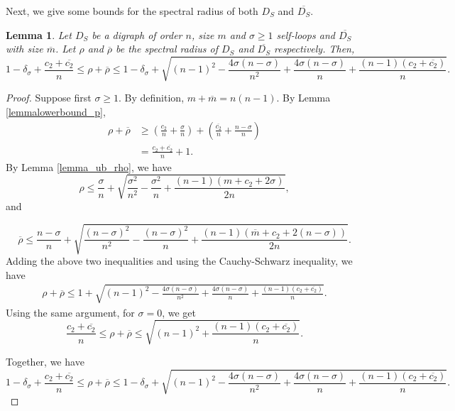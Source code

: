 \documentclass[12pt,a4paper,reqno]{amsart}
\numberwithin{equation}{section}
\theoremstyle{plain}
\newtheorem{lemma}[theorem]{Lemma}
\theoremstyle{definition}
\newcommand{\<}{\langle}
\renewcommand{\>}{\rangle}
\begin{document}
    Next, we give some bounds for the spectral radius of both $D_S$ and $\overline{D_S}$.

    \begin{lemma}
    \label{ul_bounds_p+p-}
        Let $D_S$ be a digraph of order $n$, size $m$ and $\sigma\geq1$ self-loops
        and $\overline{D_S}$ with size $\overline{m}$. Let $\rho$ and $\overline{\rho}$ be the spectral radius of $D_S$ and $\overline{D_S}$ respectively. Then,
        \begin{equation}
            \label{eq:ul_bounds_p+p-}
            1-\delta_\sigma+\frac{c_2+\overline{c_2}}{n} \leq \rho+ \overline{\rho} \leq 1-\delta_\sigma + \sqrt{ (n-1)^2-\frac{4\sigma(n-\sigma)}{n^2} + \frac{4\sigma(n-\sigma)}{n}+\frac{(n-1)(c_2+\overline{c_2})}{n} }.
        \end{equation}
    \end{lemma}

    \begin{proof}
        Suppose first $\sigma\geq1$. By definition, $m+\overline{m}=n(n-1)$. By Lemma \ref{lemmalowerbound_p}, 
        \begin{align*}
            \rho+\overline{\rho} &\geq \left( \frac{c_2}{n}+\frac{\sigma}{n} \right) + \left( \frac{\overline{c_2}}{n}+ \frac{n-\sigma}{n} \right) \\
            &=\frac{c_2+\overline{c_2}}{n} +1.
        \end{align*}
        By Lemma \ref{lemma_ub_rho}, we have
        \begin{equation}
            \rho \leq \frac{\sigma}{n} + \sqrt{\frac{\sigma^2}{n^2}-\frac{\sigma^2}{n}+\frac{(n-1)(m+c_2+2\sigma)}{2n}}, 
        \end{equation}
        and \

        \begin{equation}
            \overline{\rho} \leq \frac{n-\sigma}{n} + \sqrt{\frac{(n-\sigma)^2}{n^2}-\frac{(n-\sigma)^2}{n}+\frac{(n-1)(\overline{m}+c_2+2(n-\sigma))}{2n}}.
        \end{equation}
        Adding the above two inequalities and using the Cauchy-Schwarz inequality, we have
        \begin{align*}
            \rho+ \overline{\rho} \leq 1 + \sqrt{ (n-1)^2-\frac{4\sigma(n-\sigma)}{n^2} + \frac{4\sigma(n-\sigma)}{n}+\frac{(n-1)(c_2+\overline{c_2})}{n} }.
        \end{align*}
        Using the same argument, for $\sigma=0$, we get   
        $$\frac{c_2+\overline{c_2}}{n} \leq \rho+ \overline{\rho} \leq \sqrt{ (n-1)^2 + \frac{(n-1)(c_2+\overline{c_2})}{n} }.$$

        Together, we have 
        \begin{equation*}
            1-\delta_\sigma+\frac{c_2+\overline{c_2}}{n} \leq \rho+ \overline{\rho} \leq 1-\delta_\sigma + \sqrt{ (n-1)^2-\frac{4\sigma(n-\sigma)}{n^2} + \frac{4\sigma(n-\sigma)}{n}+\frac{(n-1)(c_2+\overline{c_2})}{n} }.
        \end{equation*}
    \end{proof}
\end{document}
